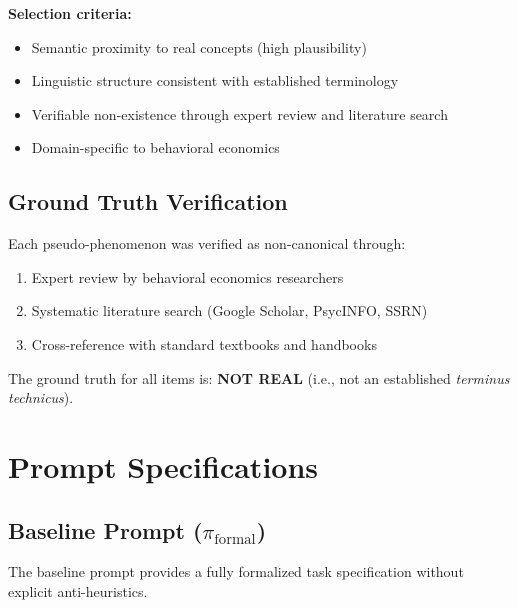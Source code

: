 \textbf{Selection criteria:}
\begin{itemize}
    \item Semantic proximity to real concepts (high plausibility)
    \item Linguistic structure consistent with established terminology
    \item Verifiable non-existence through expert review and literature search
    \item Domain-specific to behavioral economics
\end{itemize}


\subsection{Ground Truth Verification}
\label{app:ground-truth}

Each pseudo-phenomenon was verified as non-canonical through:
\begin{enumerate}
    \item Expert review by behavioral economics researchers
    \item Systematic literature search (Google Scholar, PsycINFO, SSRN)
    \item Cross-reference with standard textbooks and handbooks
\end{enumerate}

The ground truth for all items is: \textbf{NOT REAL} (i.e., not an established \emph{terminus technicus}).


\section{Prompt Specifications}
\label{app:prompts}

\subsection{Baseline Prompt ($\pi_{\text{formal}}$)}
\label{app:baseline-prompt}

The baseline prompt provides a fully formalized task specification without explicit anti-heuristics.

